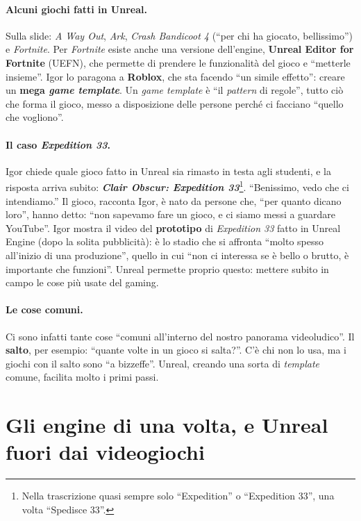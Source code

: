 \paragraph{Alcuni giochi fatti in Unreal.} Sulla slide: \emph{A Way Out}, \emph{Ark},
\emph{Crash Bandicoot 4} (``per chi ha giocato, bellissimo'') e \emph{Fortnite}. Per
\emph{Fortnite} esiste anche una versione dell'engine, \textbf{Unreal Editor for
Fortnite} (UEFN), che permette di prendere le funzionalità del gioco e ``metterle
insieme''. Igor lo paragona a \textbf{Roblox}, che sta facendo ``un simile effetto'':
creare un \textbf{mega \emph{game template}}. Un \emph{game template} è ``il
\emph{pattern} di regole'', tutto ciò che forma il gioco, messo a disposizione delle
persone perché ci facciano ``quello che vogliono''.

\paragraph{Il caso \emph{Expedition 33}.} Igor chiede quale gioco fatto in Unreal sia
rimasto in testa agli studenti, e la risposta arriva subito: \textbf{\emph{Clair
Obscur: Expedition 33}}\footnote{Nella trascrizione quasi sempre solo ``Expedition'' o
``Expedition 33'', una volta ``Spedisce 33''.}. ``Benissimo, vedo che ci intendiamo.''
Il gioco, racconta Igor, è nato da persone che, ``per quanto dicano loro'', hanno
detto: ``non sapevamo fare un gioco, e ci siamo messi a guardare YouTube''. Igor mostra
il video del \textbf{prototipo} di \emph{Expedition 33} fatto in Unreal Engine (dopo la
solita pubblicità): è lo stadio che si affronta ``molto spesso all'inizio di una
produzione'', quello in cui ``non ci interessa se è bello o brutto, è importante che
funzioni''. Unreal permette proprio questo: mettere subito in campo le cose più usate
del gaming.

\paragraph{Le cose comuni.} Ci sono infatti tante cose ``comuni all'interno del nostro
panorama videoludico''. Il \textbf{salto}, per esempio: ``quante volte in un gioco si
salta?''. C'è chi non lo usa, ma i giochi con il salto sono ``a bizzeffe''. Unreal,
creando una sorta di \emph{template} comune, facilita molto i primi passi.

\section{Gli engine di una volta, e Unreal fuori dai videogiochi}
\label{ue1:sec:storia}

